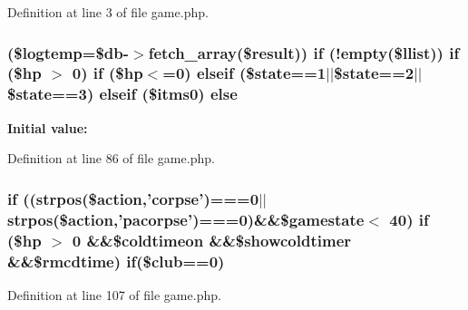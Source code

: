 Definition at line 3 of file game.\+php.

\hypertarget{game_8php_a19fe96e3b2c3c01d1540e139ae127c43}{
\subsubsection[{else}]{ (\$logtemp=\$db-\/$>$fetch\+\_\+array(\${\bf result})) {\bf if} (!empty(\$llist)) {\bf if} (\$hp $>$ 0) {\bf if} (\$hp$<$=0) {\bf elseif} (\$state==1$\vert$$\vert$\$state==2$\vert$$\vert$\$state==3) {\bf elseif} (\$itms0) else}}\label{game_8php_a19fe96e3b2c3c01d1540e139ae127c43}
{\bfseries Initial value\+:}


Definition at line 86 of file game.\+php.

\hypertarget{game_8php_a938aac4a5e30f27dabf019e363b0d356}{
\subsubsection[{if}]{\setlength{\rightskip}{0pt plus 5cm}if ((strpos(\$action,'corpse')===0$\vert$$\vert$strpos(\$action,'pacorpse')===0)\&\&\$gamestate$<$ 40) if (\$hp $>$ 0 \&\&\$coldtimeon \&\&\$showcoldtimer \&\&\$rmcdtime) if(\$club==0)}}\label{game_8php_a938aac4a5e30f27dabf019e363b0d356}


Definition at line 107 of file game.\+php.

